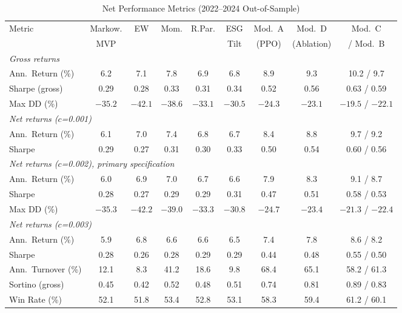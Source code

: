 \documentclass[12pt]{article}
\begin{document}
\begin{table}[t]
\centering
\caption{Net Performance Metrics (2022--2024 Out-of-Sample)}
\label{tab:net_performance}
\small
\setlength{\tabcolsep}{4.0pt}
\begin{tabular}{lcccccccc}
\toprule
Metric & Markow. & EW & Mom. & R.Par. & ESG & Mod.\ A & Mod.\ D & Mod.\ C \\
 & MVP & & & & Tilt & (PPO) & (Ablation) & / Mod.\ B \\
\midrule
\multicolumn{9}{l}{\textit{Gross returns}} \\
Ann.\ Return (\%) & 6.2 & 7.1 & 7.8 & 6.9 & 6.8 & 8.9 & 9.3 & 10.2 / 9.7 \\
Sharpe (gross) & 0.29 & 0.28 & 0.33 & 0.31 & 0.34 & 0.52 & 0.56 & 0.63 / 0.59 \\
Max DD (\%) & $-35.2$ & $-42.1$ & $-38.6$ & $-33.1$ & $-30.5$ & $-24.3$ & $-23.1$ & $-19.5$ / $-22.1$ \\
\midrule
\multicolumn{9}{l}{\textit{Net returns ($c$=0.001)}} \\
Ann.\ Return (\%) & 6.1 & 7.0 & 7.4 & 6.8 & 6.7 & 8.4 & 8.8 & 9.7 / 9.2 \\
Sharpe & 0.29 & 0.27 & 0.31 & 0.30 & 0.33 & 0.50 & 0.54 & 0.60 / 0.56 \\
\midrule
\multicolumn{9}{l}{\textit{Net returns ($c$=0.002), primary specification}} \\
Ann.\ Return (\%) & 6.0 & 6.9 & 7.0 & 6.7 & 6.6 & 7.9 & 8.3 & 9.1 / 8.7 \\
Sharpe & 0.28 & 0.27 & 0.29 & 0.29 & 0.31 & 0.47 & 0.51 & 0.58 / 0.53 \\
Max DD (\%) & $-35.3$ & $-42.2$ & $-39.0$ & $-33.3$ & $-30.8$ & $-24.7$ & $-23.4$ & $-21.3$ / $-22.4$ \\
\midrule
\multicolumn{9}{l}{\textit{Net returns ($c$=0.003)}} \\
Ann.\ Return (\%) & 5.9 & 6.8 & 6.6 & 6.6 & 6.5 & 7.4 & 7.8 & 8.6 / 8.2 \\
Sharpe & 0.28 & 0.26 & 0.28 & 0.29 & 0.29 & 0.44 & 0.48 & 0.55 / 0.50 \\
\midrule
Ann.\ Turnover (\%) & 12.1 & 8.3 & 41.2 & 18.6 & 9.8 & 68.4 & 65.1 & 58.2 / 61.3 \\
Sortino (gross) & 0.45 & 0.42 & 0.52 & 0.48 & 0.51 & 0.74 & 0.81 & 0.89 / 0.83 \\
Win Rate (\%) & 52.1 & 51.8 & 53.4 & 52.8 & 53.1 & 58.3 & 59.4 & 61.2 / 60.1 \\
\bottomrule
\end{tabular}
\begin{tablenotes}

\end{tablenotes}
\end{table}
\end{document}
